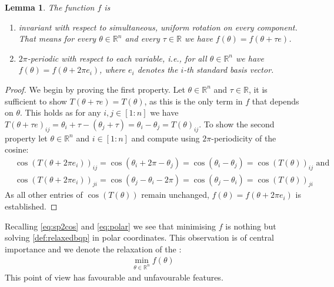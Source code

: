 \documentclass[12pt,a4paper]{article}
\theoremstyle{mythm}
\newtheorem{lem}[thm]{Lemma}
\begin{document}
\begin{lem}
\label{prop:propertiesf} 
The function $ f $ is 
\begin{enumerate}
\item 
invariant with respect to simultaneous, uniform rotation on every component. That means for every $ \theta \in \mathbb{R} ^{ n }  $ and every  $ \tau \in \mathbb{R}  $ we have $ f (\theta) = f (\theta + \tau e) $.
\item $ 2 \pi  $-periodic with respect to each variable, i.e., for all $ \theta \in \mathbb{R} ^{ n }  $ we have $ f ( \theta ) = f ( \theta + 2 \pi e_i)  $, where $ e_i $
denotes the $ i $-th standard basis vector.
\end{enumerate}
\end{lem} 
\begin{proof}
We begin by proving the first property. Let $ \theta \in \mathbb{R} ^{ n }  $ and $ \tau \in \mathbb{R}  $, it is sufficient to show $ T ( \theta + \tau e) = T ( \theta) $,
as this is the only term in $ f $ that depends on $ \theta $.
This holds as for any $ i,j \in \left[ 1:n \right]  $ we have $T ( \theta + \tau e) _{ ij } =  \theta _{ i } + \tau - ( \theta _{ j } + \tau ) = \theta _{ i } - \theta _{ j } = T(
\theta) _{ ij }  $.
To show the second property let $ \theta \in \mathbb{R} ^{ n }  $ and $ i \in \left[ 1:n \right]  $ and compute using $ 2 \pi  $-periodicity of the cosine:
\begin{align*}
&\cos(   T ( \theta + 2 \pi e_i) )_{ ij } =  \cos( \theta_i + 2 \pi - \theta_j ) = \cos( \theta_i - \theta_j ) = \cos( T (\theta) ) _{ ij } \text{ and} \\
&\cos(   T ( \theta + 2 \pi e_i) )_{ ji } =  \cos( \theta_j - \theta_i - 2 \pi ) = \cos( \theta_j - \theta_i ) = \cos( T (\theta) ) _{ ji }
\end{align*} 
As all other entries of $ \cos( T(\theta) )   $ remain unchanged, $ f(\theta) = f(\theta+2\pi e_i) $ is established.
\end{proof}
Recalling \ref{eq:sp2cos} and \ref{eq:polar} we see that minimising $ f $ is nothing but solving \ref{def:relaxedbqp} in polar coordinates.
This observation is of central importance and we denote the relaxation of the \MCP:
\begin{align}
\label{def:minf}
\min_{\theta \in \mathbb{R} ^{ n } } f(\theta)
\end{align} 
This point of view has favourable and unfavourable features.
\end{document}
